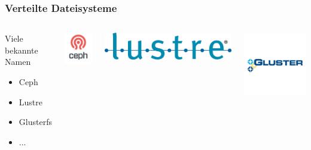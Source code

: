 \documentclass{beamer}
\begin{document}
\begin{frame}
	\frametitle{Verteilte Dateisysteme}
	\begin{columns}
	\begin{block}{Viele bekannte Namen}
	\begin{itemize}
		\item Ceph
		\item Lustre
		\item Glusterfs
		\item ...
	\end{itemize}
	\end{block}
	\includegraphics[scale=0.22]{ceph.jpg}

	\vspace{0.8cm}	
	\includegraphics[scale=0.2]{lustre.png}
	
	\includegraphics[scale=0.2]{gluster.jpg}
	\end{columns}
\end{frame}
\end{document}
